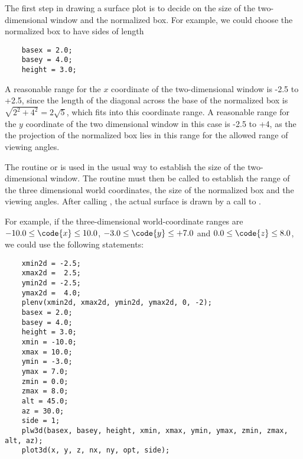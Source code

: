 The first step in drawing a surface plot is to decide on the size of the
two-dimensional window and the normalized box.  For example, we could
choose the normalized box to have sides of length

\begin{verbatim}
    basex = 2.0;
    basey = 4.0;
    height = 3.0;
\end{verbatim}

A reasonable range for the $x$ coordinate of the two-dimensional window
is -2.5 to +2.5, since the length of the diagonal across the base of the
normalized box is $\sqrt{2^2+4^2} = 2\sqrt{5}$, which fits into this
coordinate range.  A reasonable range for the $y$ coordinate of the two
dimensional window in this case is -2.5 to +4, as the the projection of
the normalized box lies in this range for the allowed range of viewing
angles.

The routine  or  is used in the usual way to
establish the size of the two-dimensional window.  The routine
 must then be called to establish the range of the three
dimensional world coordinates, the size of the normalized box and the
viewing angles.  After calling , the actual surface is drawn
by a call to .

For example, if the three-dimensional world-coordinate ranges are
$-10.0\le\code{x}\le 10.0$, $-3.0\le\code{y}\le +7.0$ and
$0.0\le\code{z}\le 8.0$, we could use the following statements:

\begin{verbatim}
    xmin2d = -2.5;
    xmax2d =  2.5;
    ymin2d = -2.5;
    ymax2d =  4.0;
    plenv(xmin2d, xmax2d, ymin2d, ymax2d, 0, -2);
    basex = 2.0;
    basey = 4.0;
    height = 3.0;
    xmin = -10.0;
    xmax = 10.0;
    ymin = -3.0;
    ymax = 7.0;
    zmin = 0.0;
    zmax = 8.0;
    alt = 45.0;
    az = 30.0;
    side = 1;
    plw3d(basex, basey, height, xmin, xmax, ymin, ymax, zmin, zmax, alt, az);
    plot3d(x, y, z, nx, ny, opt, side);
\end{verbatim}

